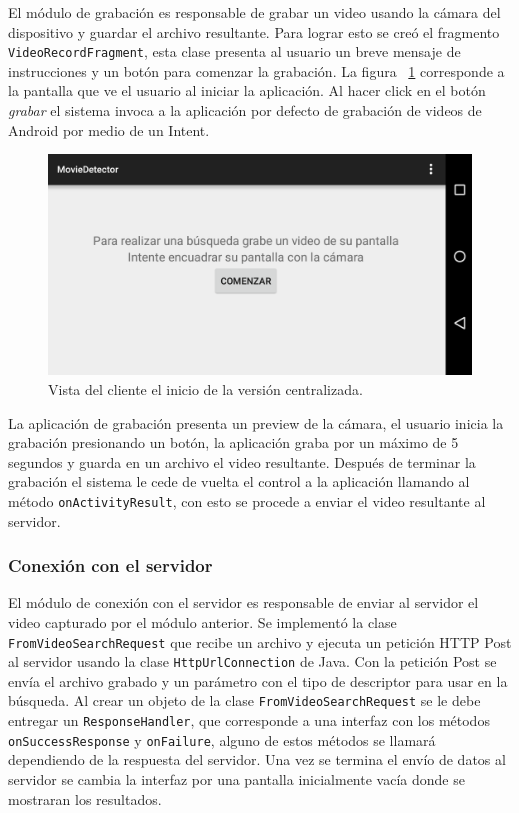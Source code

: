 El módulo de grabación es responsable de grabar un video usando la cámara del dispositivo y guardar el archivo resultante. Para lograr esto se creó el fragmento \texttt{VideoRecordFragment}, esta clase presenta al usuario un breve mensaje de instrucciones y un botón para comenzar la grabación. La figura ~\ref{pantalla_inicial_centralizada} corresponde a la pantalla que ve el usuario al iniciar la aplicación. Al hacer click en el botón \emph{grabar} el sistema invoca a la aplicación por defecto de grabación de videos de Android por medio de un Intent.
	\begin{figure}[!h]
		\centering
		\includegraphics[scale=0.3]{imagenes/cap4/pantalla_inicial_centralizada}
		\caption{Vista del cliente el inicio de la versión centralizada.}
		\label{pantalla_inicial_centralizada}
	\end{figure}
La aplicación de grabación presenta un preview de la cámara, el usuario inicia la grabación presionando un botón, la aplicación graba por un máximo de 5 segundos y guarda en un archivo el video resultante. Después de terminar la grabación el sistema le cede de vuelta el control a la aplicación llamando al método \texttt{onActivityResult}, con esto se procede a enviar el video resultante al servidor.


\subsubsection*{Conexión con el servidor}
El módulo de conexión con el servidor es responsable de enviar al servidor el video capturado por el módulo anterior. Se implementó la clase \texttt{FromVideoSearchRequest} que recibe un archivo y ejecuta un petición HTTP Post al servidor usando la clase \texttt{HttpUrlConnection} de Java. Con la petición Post se envía el archivo grabado y un parámetro con el tipo de descriptor para usar en la búsqueda. Al crear un objeto de la clase \texttt{FromVideoSearchRequest} se le debe entregar un \texttt{ResponseHandler}, que corresponde a una interfaz con los métodos \texttt{onSuccessResponse} y \texttt{onFailure}, alguno de estos métodos se llamará dependiendo de la respuesta del servidor.
Una vez se termina el envío de datos al servidor se cambia la interfaz por una pantalla inicialmente vacía donde se mostraran los resultados.

